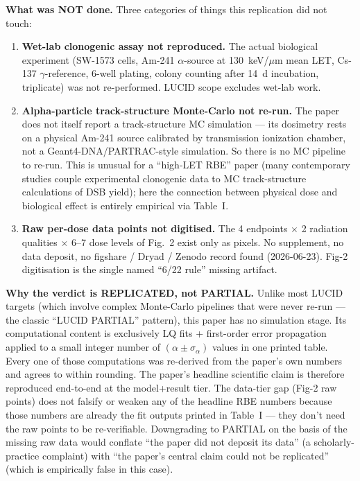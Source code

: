 \documentclass[11pt]{article}
\begin{document}
\textbf{What was NOT done.}
Three categories of things this replication did not touch:
\begin{enumerate}
\item \textbf{Wet-lab clonogenic assay not reproduced.} The actual
      biological experiment (SW-1573 cells, Am-241 $\alpha$-source at
      130~keV/$\mu$m mean LET, Cs-137 $\gamma$-reference, 6-well plating,
      colony counting after 14~d incubation, triplicate) was not
      re-performed. LUCID scope excludes wet-lab work.
\item \textbf{Alpha-particle track-structure Monte-Carlo not re-run.}
      The paper does not itself report a track-structure MC simulation
      --- its dosimetry rests on a physical Am-241 source calibrated
      by transmission ionization chamber, not a Geant4-DNA/PARTRAC-style
      simulation. So there is no MC pipeline to re-run. This is
      unusual for a ``high-LET RBE'' paper (many contemporary studies
      couple experimental clonogenic data to MC track-structure
      calculations of DSB yield); here the connection between physical
      dose and biological effect is entirely empirical via Table~I.
\item \textbf{Raw per-dose data points not digitised.} The 4 endpoints
      $\times$ 2 radiation qualities $\times$ 6--7 dose levels of Fig.~2
      exist only as pixels. No supplement, no data deposit, no figshare
      / Dryad / Zenodo record found (2026-06-23). Fig-2 digitisation is
      the single named ``6/22 rule'' missing artifact.
\end{enumerate}

\textbf{Why the verdict is REPLICATED, not PARTIAL.}
Unlike most LUCID targets (which involve complex Monte-Carlo pipelines
that were never re-run --- the classic ``LUCID PARTIAL'' pattern), this
paper has no simulation stage. Its computational content is exclusively
LQ fits + first-order error propagation applied to a small integer
number of $(\alpha \pm \sigma_\alpha)$ values in one printed table. Every
one of those computations was re-derived from the paper's own numbers
and agrees to within rounding. The paper's headline scientific claim is
therefore reproduced end-to-end at the model+result tier. The data-tier
gap (Fig-2 raw points) does not falsify or weaken any of the headline
RBE numbers because those numbers are already the fit outputs printed in
Table~I --- they don't need the raw points to be re-verifiable. Downgrading
to PARTIAL on the basis of the missing raw data would conflate ``the paper
did not deposit its data'' (a scholarly-practice complaint) with ``the
paper's central claim could not be replicated'' (which is empirically
false in this case).
\end{document}
